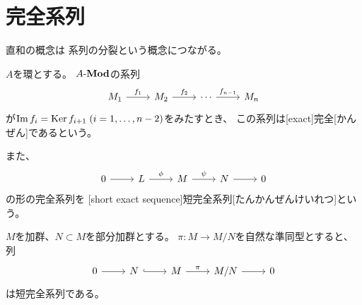 \documentclass[report]{jlreq}
\begin{document}
%
\section{完全系列}

直和の概念は
系列の分裂という概念につながる。

\begin{definition}[完全系列]
    $A$を環とする。
    $A\text{-}\mathbf{Mod}$の系列
    \begin{equation}
        \begin{tikzcd}
            M_1
                \ar{r}{f_1}
                & M_2
                    \ar{r}{f_2}
                & \cdots
                    \ar{r}{f_{n-1}}
                & M_n
        \end{tikzcd}
    \end{equation}
    が$\operatorname{\mathrm{Im}} f_i = \operatorname{\mathrm{Ker}} f_{i + 1} \; (i = 1, \dots, n - 2)$をみたすとき、
    この系列は[exact]{完全}[かんぜん]であるという。

    また、
    \begin{equation}
        \begin{tikzcd}
            0
                \ar{r}
                & L
                    \ar{r}{\phi}
                & M
                    \ar{r}{\psi}
                & N
                    \ar{r}
                & 0
        \end{tikzcd}
    \end{equation}
    の形の完全系列を
    [short exact sequence]{短完全系列}[たんかんぜんけいれつ]という。
\end{definition}

\begin{example}[短完全系列の例]
    $M$を加群、$N \subset M$を部分加群とする。
    $\pi \colon M \to M/N$を自然な準同型とすると、列
    \begin{equation}
        \begin{tikzcd}
            0 \ar{r} & N \ar[hook]{r} & M \ar{r}{\pi} & M/N \ar{r} & 0
        \end{tikzcd}
    \end{equation}
    は短完全系列である。
\end{example}
\end{document}
